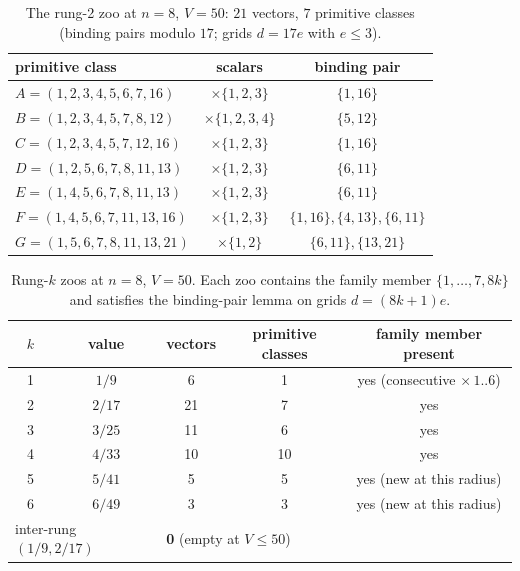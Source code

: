 \documentclass[11pt,a4paper]{article}
\theoremstyle{plain}
\theoremstyle{definition}
\theoremstyle{remark}
\begin{document}
\begin{table}[htbp]
\centering
\caption{The rung-2 zoo at $n = 8$, $V = 50$: $21$ vectors, $7$ primitive
classes (binding pairs modulo $17$; grids $d = 17e$ with $e \le 3$).}
\label{tab:rung2}
\small
\begin{tabular}{@{}lcc@{}}
\toprule
primitive class & scalars & binding pair \\
\midrule
$A = (1,2,3,4,5,6,7,16)$   & $\times\{1,2,3\}$ & $\{1,16\}$ \\
$B = (1,2,3,4,5,7,8,12)$   & $\times\{1,2,3,4\}$ & $\{5,12\}$ \\
$C = (1,2,3,4,5,7,12,16)$  & $\times\{1,2,3\}$ & $\{1,16\}$ \\
$D = (1,2,5,6,7,8,11,13)$  & $\times\{1,2,3\}$ & $\{6,11\}$ \\
$E = (1,4,5,6,7,8,11,13)$  & $\times\{1,2,3\}$ & $\{6,11\}$ \\
$F = (1,4,5,6,7,11,13,16)$ & $\times\{1,2,3\}$ & $\{1,16\}, \{4,13\}, \{6,11\}$ \\
$G = (1,5,6,7,8,11,13,21)$ & $\times\{1,2\}$ & $\{6,11\}, \{13,21\}$ \\
\bottomrule
\end{tabular}
\end{table}

\begin{table}[htbp]
\centering
\caption{Rung-$k$ zoos at $n = 8$, $V = 50$. Each zoo contains the family
member $\{1, \dots, 7, 8k\}$ and satisfies the binding-pair lemma on grids
$d = (8k+1)e$.}
\label{tab:rungk}
\small
\begin{tabular}{@{}ccccc@{}}
\toprule
$k$ & value & vectors & primitive classes & family member present \\
\midrule
1 & $1/9$    & 6  & 1 & yes (consecutive $\times\,1..6$) \\
2 & $2/17$   & 21 & 7 & yes \\
3 & $3/25$   & 11 & 6 & yes \\
4 & $4/33$   & 10 & 10 & yes \\
5 & $5/41$   & 5  & 5 & yes (new at this radius) \\
6 & $6/49$   & 3  & 3 & yes (new at this radius) \\
\midrule
\multicolumn{2}{l}{inter-rung $(1/9, 2/17)$} & \multicolumn{3}{l}{\textbf{0} (empty at $V \le 50$)} \\
\bottomrule
\end{tabular}
\end{table}
\end{document}
